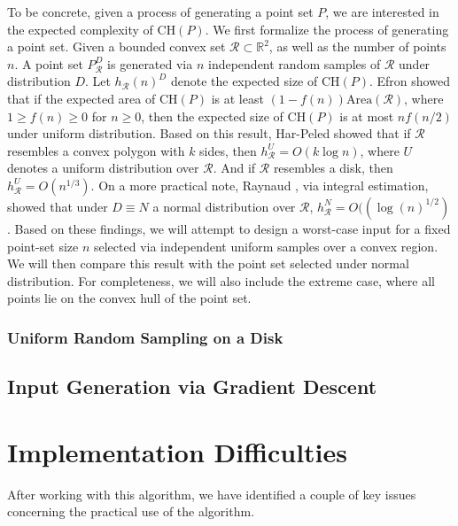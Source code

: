 \documentclass{article}
\newcommand{\CH}{\mathrm{CH}}
\begin{document}
To be concrete, given a process of generating a point set $P$, we are interested in the expected complexity of $\CH(P)$. We first formalize the process of generating a point set. Given a bounded convex set $\mathcal{R} \subset \mathbb{R}^2$, as well as the number of points $n$. A point set $P_\mathcal{R}^D$ is generated via $n$ independent random samples of $\mathcal{R}$ under distribution $D$. Let $h_\mathcal{R}(n)^D$ denote the expected size of $\CH(P)$. Efron \cite{efr65} showed that if the expected area of $\CH(P)$ is at least $(1-f(n)) \mathrm{Area}(\mathcal{R})$, where $1 \geq f(n) \geq 0$ for $n \geq 0$, then the expected size of $\CH(P)$ is at most $nf(n/2)$ under uniform distribution. Based on this result, Har-Peled \cite{hp11} showed that if $\mathcal{R}$ resembles a convex polygon with $k$ sides, then $h_\mathcal{R}^U = O(k \log n)$, where $U$ denotes a uniform distribution over $\mathcal{R}$. And if $\mathcal{R}$ resembles a disk, then $h_\mathcal{R}^U = O(n^{1/3})$. On a more practical note, Raynaud \cite{ray70}, via integral estimation, showed that under $D \equiv N$ a normal distribution over $\mathcal{R}$, $h_\mathcal{R}^N = O((\log(n)^{1/2})$. Based on these findings, we will attempt to design a worst-case input for a fixed point-set size $n$ selected via independent uniform samples over a convex region. We will then compare this result with the point set selected under normal distribution. For completeness, we will also include the extreme case, where all points lie on the convex hull of the point set.

\subsubsection{Uniform Random Sampling on a Disk}



\subsection{Input Generation via Gradient Descent}


\section{Implementation Difficulties}

After working with this algorithm, we have identified a couple of key issues concerning the practical use of the algorithm.
\end{document}
